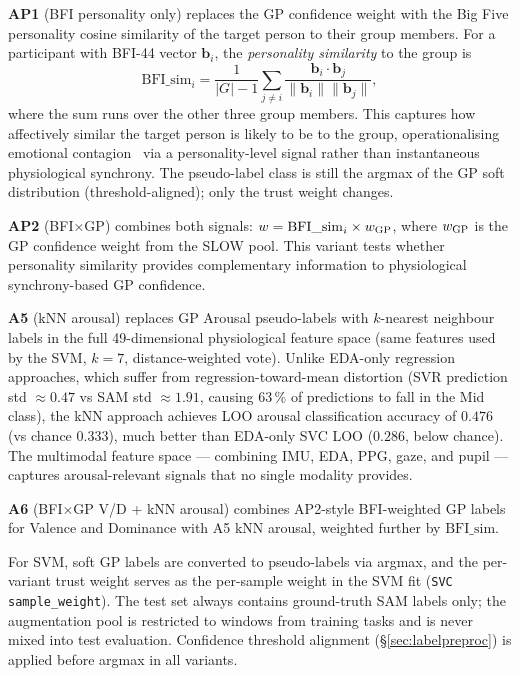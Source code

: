 \documentclass[sigconf,review,anonymous]{acmart}
\begin{document}
\textbf{AP1} (BFI personality only) replaces the GP confidence weight with
the Big Five personality cosine similarity of the target person to their group
members.
For a participant with BFI-44 vector $\mathbf{b}_i$, the \emph{personality
similarity} to the group is
\begin{equation}
  \mathrm{BFI\_sim}_i = \frac{1}{|G|-1}\sum_{j \neq i}
    \frac{\mathbf{b}_i \cdot \mathbf{b}_j}{\|\mathbf{b}_i\|\|\mathbf{b}_j\|},
\end{equation}
where the sum runs over the other three group members.
This captures how affectively similar the target person is likely to be
to the group, operationalising emotional contagion~\cite{hatfield1993emotional}
via a personality-level signal rather than instantaneous physiological synchrony.
The pseudo-label class is still the argmax of the GP soft distribution
(threshold-aligned); only the trust weight changes.

\textbf{AP2} (BFI$\times$GP) combines both signals:
$w = \mathrm{BFI\_sim}_i \times w_{\rm GP}$,
where $w_{\rm GP}$ is the GP confidence weight from the SLOW pool.
This variant tests whether personality similarity provides complementary
information to physiological synchrony-based GP confidence.

\textbf{A5} (kNN arousal) replaces GP Arousal pseudo-labels with $k$-nearest
neighbour labels in the full 49-dimensional physiological feature space
(same features used by the SVM, $k{=}7$, distance-weighted vote).
Unlike EDA-only regression approaches, which suffer from regression-toward-mean
distortion (SVR prediction std ${\approx}0.47$ vs SAM std ${\approx}1.91$,
causing 63\,\% of predictions to fall in the Mid class), the kNN approach
achieves LOO arousal classification accuracy of $0.476$ (vs chance $0.333$),
much better than EDA-only SVC LOO ($0.286$, below chance).
The multimodal feature space --- combining IMU, EDA, PPG, gaze, and pupil ---
captures arousal-relevant signals that no single modality provides.

\textbf{A6} (BFI$\times$GP V/D + kNN arousal) combines AP2-style
BFI-weighted GP labels for Valence and Dominance with A5 kNN arousal,
weighted further by $\mathrm{BFI\_sim}$.

For SVM, soft GP labels are converted to pseudo-labels via argmax, and the
per-variant trust weight serves as the per-sample weight in the SVM fit
(\texttt{SVC sample\_weight}).
The test set always contains ground-truth SAM labels only; the augmentation
pool is restricted to windows from training tasks and is never mixed into test
evaluation.
Confidence threshold alignment (\S\ref{sec:labelpreproc}) is applied before
argmax in all variants.
\end{document}
